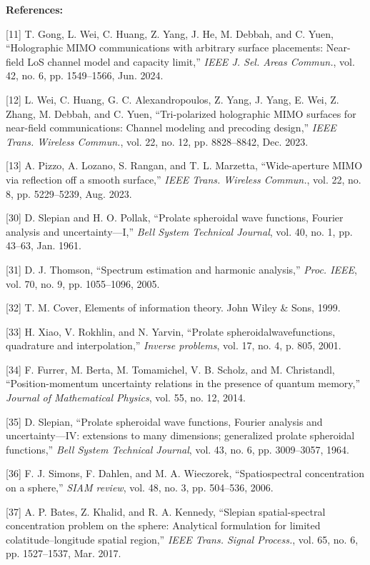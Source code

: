\documentclass[a4paper,12pt]{article}
\begin{document}
{\color{blue}
	{\bf References:}
	
	[11] T. Gong, L. Wei, C. Huang, Z. Yang, J. He, M. Debbah, and C. Yuen, “Holographic MIMO communications with arbitrary surface
	placements: Near-field LoS channel model and capacity limit,” {\it IEEE J. Sel. Areas Commun.}, vol. 42, no. 6, pp. 1549–1566, Jun.
	2024.
	
	[12] L. Wei, C. Huang, G. C. Alexandropoulos, Z. Yang, J. Yang, E. Wei, Z. Zhang, M. Debbah, and C. Yuen, “Tri-polarized holographic
	MIMO surfaces for near-field communications: Channel modeling and precoding design,” {\it IEEE Trans. Wireless Commun.}, vol. 22,
	no. 12, pp. 8828–8842, Dec. 2023.
	
	[13] A. Pizzo, A. Lozano, S. Rangan, and T. L. Marzetta, “Wide-aperture MIMO via reflection off a smooth surface,” {\it IEEE Trans.
		Wireless Commun.}, vol. 22, no. 8, pp. 5229–5239, Aug. 2023.
	
	[30] D. Slepian and H. O. Pollak, “Prolate spheroidal wave functions, Fourier analysis and uncertainty—I,” {\it Bell System Technical
		Journal}, vol. 40, no. 1, pp. 43–63, Jan. 1961.
	
	[31] D. J. Thomson, “Spectrum estimation and harmonic analysis,” {\it Proc. IEEE}, vol. 70, no. 9, pp. 1055–1096, 2005.
	
	[32] T. M. Cover, Elements of information theory. John Wiley \& Sons, 1999.
	
	[33] H. Xiao, V. Rokhlin, and N. Yarvin, “Prolate spheroidalwavefunctions, quadrature and interpolation,” {\it Inverse problems}, vol. 17,
	no. 4, p. 805, 2001.
	
	[34] F. Furrer, M. Berta, M. Tomamichel, V. B. Scholz, and M. Christandl, “Position-momentum uncertainty relations in the presence
	of quantum memory,” {\it Journal of Mathematical Physics}, vol. 55, no. 12, 2014.
	
	[35] D. Slepian, “Prolate spheroidal wave functions, Fourier analysis and uncertainty—IV: extensions to many dimensions; generalized
	prolate spheroidal functions,” {\it Bell System Technical Journal}, vol. 43, no. 6, pp. 3009–3057, 1964.
	
	[36] F. J. Simons, F. Dahlen, and M. A. Wieczorek, “Spatiospectral concentration on a sphere,” {\it SIAM review}, vol. 48, no. 3, pp. 504–536,
	2006.
	
	[37] A. P. Bates, Z. Khalid, and R. A. Kennedy, “Slepian spatial-spectral concentration problem on the sphere: Analytical formulation
	for limited colatitude–longitude spatial region,” {\it IEEE Trans. Signal Process.}, vol. 65, no. 6, pp. 1527–1537, Mar. 2017.
	
}
\end{document}
